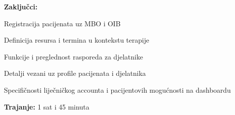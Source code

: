 \begin{packed_enum}
\begin{packed_item}
\begin{packed_item}
                        \item \textbf{Zaključci:}
                            \begin{packed_item}
                                \item Registracija pacijenata uz MBO i OIB
                                \item Definicija resursa i termina u kontekstu terapije
                                \item Funkcije i preglednost rasporeda za djelatnike
                                \item Detalji vezani uz profile pacijenata i djelatnika
                                \item Specifičnosti liječničkog accounta i pacijentovih mogućnosti na dashboardu
                            \end{packed_item}
                        \item \textbf{Trajanje:} 1 sat i 45 minuta
                    \end{packed_item}
            \end{packed_item}

\vspace{30pt}


\end{packed_enum}
